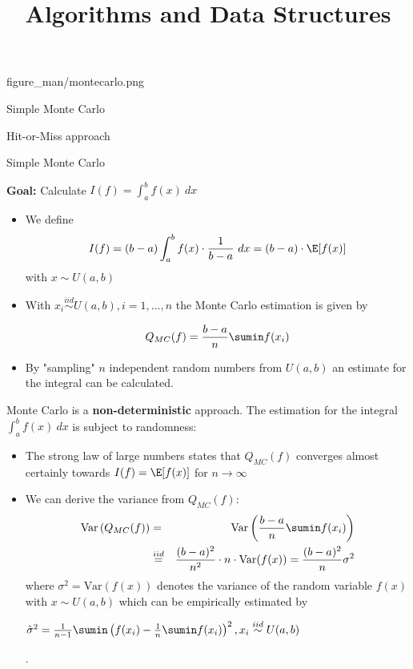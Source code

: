 \documentclass[11pt,compress,t,notes=noshow, xcolor=table]{beamer}
\title{Algorithms and Data Structures}
\begin{document}
{figure_man/montecarlo.png}
{
  \item Simple Monte Carlo
  \item Hit-or-Miss approach
}


\begin{vbframe}{Simple Monte Carlo}

\textbf{Goal:} Calculate $I(f) = \int_a^b f(x)~dx$

\begin{itemize}
\item We define
$$
I(f) = (b - a)\int_a^b f(x)\cdot \frac{1}{b - a}~dx = (b - a)\cdot \E[f(x)]
$$
with $x \sim U(a, b)$
\item With $x_i \overset{iid}{\sim} U(a, b), i = 1, ..., n$ the Monte Carlo estimation is given by

$$
Q_{MC}(f) = \frac{b - a}{n} \sumin f(x_i)
$$
\item By "sampling" $n$ independent random numbers from $U(a,b)$ an estimate for the integral can be calculated.
\end{itemize}

\framebreak

Monte Carlo is a \textbf{non-deterministic} approach. The estimation for the integral $\int_a^b f(x) ~dx$ is subject to randomness:

\begin{itemize}
\item The strong law of large numbers states that $Q_{MC}(f)$ converges almost certainly towards $I(f) = \E[f(x)]$ for $n\to\infty$
\item We can derive the variance from $Q_{MC}(f)$:
\vspace*{-0.2cm}
\begin{eqnarray*}
\text{Var}\left(Q_{MC}(f)\right) &=& \text{Var}\left(\frac{b - a}{n} \sumin f(x_i)\right) \\
&\overset{iid}{=}& \frac{(b - a)^2}{n^2}\cdot n \cdot \text{Var}(f(x)) = \frac{(b - a)^2}{n} \sigma^2
\end{eqnarray*}
where $\sigma^2 = \text{Var}(f(x))$ denotes the variance of the random variable $f(x)$ with $x \sim U(a, b)$ which can be empirically estimated by \begin{footnotesize}$\hat \sigma^2 = \frac{1}{n - 1} \sumin \left(f(x_i) - \frac{1}{n}\sumin f(x_i)\right)^2, x_i \overset{iid}{\sim} U(a, b)$\end{footnotesize}.


\end{itemize}
\end{vbframe}
\end{document}
